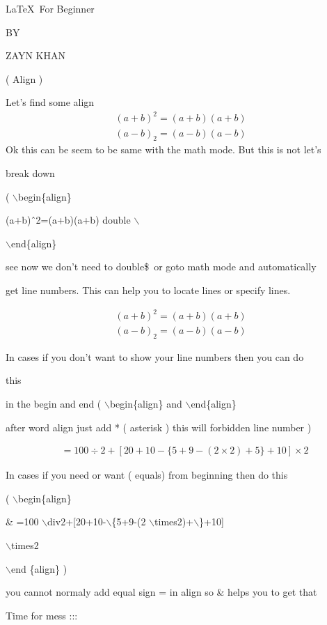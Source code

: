\documentclass[11pt]{article}
\begin{document}
\begin{center}
\Large \LaTeX\ For Beginner

\small BY

\Large ZAYN KHAN

\large ( Align )
\end{center}


Let's find some align
\begin{align}
(a+b)^2=(a+b)(a+b)\\
(a-b)_2=(a-b)(a-b)
\end{align}
Ok this can be seem to be same with the math mode. But this is not let's

 break down

( $\backslash$begin\{align\} 

(a+b)\^\ 2=(a+b)(a+b) double $\backslash$

$\backslash$end\{align\}

see now we don't need to double\$\ or goto math mode and automatically

 get
line numbers. This can help you to locate lines or specify lines.

\begin{align*}
(a+b)^2=(a+b)(a+b)\\
(a-b)_2=(a-b)(a-b)
\end{align*}

In cases if you don't want to show your line numbers then you can do

 this

in the begin and end ( $\backslash$begin\{align\} and $\backslash$end\{align\}

after word align just add * ( asterisk ) this will forbidden line number )

\begin{align*}
&=100\div2+[20+10-\{5+9-(2\times2)+5\}+10]\times2
\end{align*}

In cases if you need or want  ( equals) from beginning then do this

( $\backslash$begin\{align\}

\& =100 $\backslash$div2+[20+10-$\backslash$\{5+9-(2 $\backslash$times2)+$\backslash$\}+10]

$\backslash$times2 

$\backslash$end \{align\} )

you cannot normaly add equal sign = in align so \& helps you to get that

\pagebreak

Time for mess :::
\end{document}
